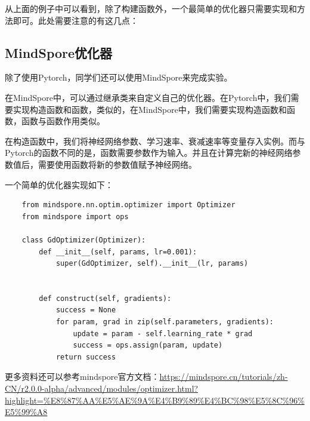 从上面的例子中可以看到，除了构建函数外，一个最简单的优化器只需要实现和方法即可。此处需要注意的有这几点：

\subsection{MindSpore优化器}

除了使用Pytorch，同学们还可以使用MindSpore来完成实验。

在MindSpore中，可以通过继承类来自定义自己的优化器。在Pytorch中，我们需要实现构造函数和函数，类似的，在MindSpore中，我们需要实现构造函数和函数，函数与函数作用类似。

在构造函数中，我们将神经网络参数、学习速率、衰减速率等变量存入实例。而与Pytorch的函数不同的是，函数需要参数作为输入。并且在计算完新的神经网络参数值后，需要使用函数将新的参数值赋予神经网络。

一个简单的优化器实现如下：
\begin{lstlisting}
    from mindspore.nn.optim.optimizer import Optimizer
    from mindspore import ops

    class GdOptimizer(Optimizer):
        def __init__(self, params, lr=0.001):
            super(GdOptimizer, self).__init__(lr, params)

        
        def construct(self, gradients):
            success = None
            for param, grad in zip(self.parameters, gradients):
                update = param - self.learning_rate * grad
                success = ops.assign(param, update)
            return success
\end{lstlisting}

更多资料还可以参考mindspore官方文档：\url{https://mindspore.cn/tutorials/zh-CN/r2.0.0-alpha/advanced/modules/optimizer.html?highlight=%E8%87%AA%E5%AE%9A%E4%B9%89%E4%BC%98%E5%8C%96%E5%99%A8}


